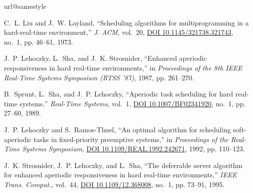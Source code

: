 \documentclass[12pt,onecolumn]{IEEEtranTIE}
\begin{document}
\begin{thebibliography}{10}
\providecommand{\url}[1]{#1}
\csname url@samestyle\endcsname
\providecommand{\newblock}{\relax}
\providecommand{\bibinfo}[2]{#2}
\providecommand{\BIBentrySTDinterwordspacing}{\spaceskip=0pt\relax}
\providecommand{\BIBentryALTinterwordstretchfactor}{4}
\providecommand{\BIBentryALTinterwordspacing}{\spaceskip=\fontdimen2\font plus
\BIBentryALTinterwordstretchfactor\fontdimen3\font minus
  \fontdimen4\font\relax}
\providecommand{\BIBforeignlanguage}[2]{{%
\expandafter\ifx\csname l@#1\endcsname\relax
\typeout{** WARNING: IEEEtran.bst: No hyphenation pattern has been}%
\typeout{** loaded for the language `#1'. Using the pattern for}%
\typeout{** the default language instead.}%
\else
\language=\csname l@#1\endcsname
\fi
#2}}
\providecommand{\BIBdecl}{\relax}
\BIBdecl

C.~L. Liu and J.~W. Layland, ``Scheduling algorithms for multiprogramming in a
  hard-real-time environment,'' \emph{J. {ACM}}, vol.~20,
  \href{http://dx.doi.org/10.1145/321738.321743}{DOI 10.1145/321738.321743},
  no.~1, pp. 46--61, 1973.

J.~P. Lehoczky, L.~Sha, and J.~K. Strosnider, ``Enhanced aperiodic
  responsiveness in hard real-time environments,'' in \emph{Proceedings of the
  8th {IEEE} Real-Time Systems Symposium {(RTSS} '87)}, 1987, pp. 261--270.

B.~Sprunt, L.~Sha, and J.~P. Lehoczky, ``Aperiodic task scheduling for hard
  real-time systems,'' \emph{Real-Time Systems}, vol.~1,
  \href{http://dx.doi.org/10.1007/BF02341920}{DOI 10.1007/BF02341920}, no.~1,
  pp. 27--60, 1989.

J.~P. Lehoczky and S.~Ramos{-}Thuel, ``An optimal algorithm for scheduling
  soft-aperiodic tasks in fixed-priority preemptive systems,'' in
  \emph{Proceedings of the Real-Time Systems Symposium},
  \href{http://dx.doi.org/10.1109/REAL.1992.242671}{DOI
  10.1109/REAL.1992.242671}, 1992, pp. 110--123.

J.~K. Strosnider, J.~P. Lehoczky, and L.~Sha, ``The deferrable server algorithm
  for enhanced aperiodic responsiveness in hard real-time environments,''
  \emph{{IEEE} Trans. Comput.}, vol.~44,
  \href{http://dx.doi.org/10.1109/12.368008}{DOI 10.1109/12.368008}, no.~1, pp.
  73--91, 1995.


\end{thebibliography}
\end{document}
